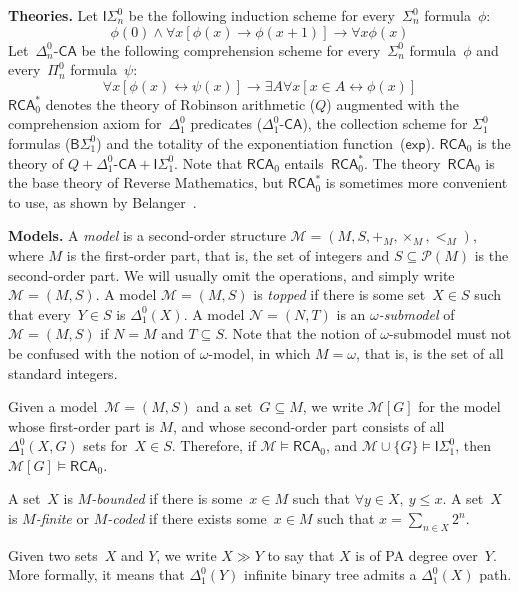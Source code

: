 \documentclass{article}
\numberwithin{theorem}{section}
\newcommand{\RCA}{\mathsf{RCA}}
\newcommand{\BSig}{\mathsf{B}\Sigma^0}
\newcommand{\ISig}{\mathsf{I}\Sigma^0}
\renewcommand{\P}{\mathcal{P}}
\newcommand{\M}{\mathcal{M}}
\newcommand{\Nc}{\mathcal{N}}
\renewcommand{\P}{\mathcal{P}}
\begin{document}
\textbf{Theories.}
Let $\ISig_n$ be the following induction scheme for every~$\Sigma^0_n$ formula~$\phi$:
$$
\phi(0) \wedge \forall x[\phi(x) \rightarrow \phi(x+1)] \rightarrow \forall x \phi(x)
$$
Let~$\Delta^0_n$-$\mathsf{CA}$ be the following comprehension scheme for every~$\Sigma^0_n$ formula~$\phi$ and every~$\Pi^0_n$ formula~$\psi$:
$$
\forall x[\phi(x) \leftrightarrow \psi(x)] \rightarrow \exists A \forall x[x \in A \leftrightarrow \phi(x)]
$$
$\RCA_0^*$ denotes the theory of Robinson arithmetic ($Q$) augmented with the comprehension axiom for~$\Delta^0_1$ predicates ($\Delta^0_1$-$\mathsf{CA}$), the collection scheme for $\Sigma^0_1$ formulas ($\BSig_1$) and the totality of the exponentiation function~($\mathsf{exp}$).
$\RCA_0$ is the theory of $Q + \Delta^0_1\mbox{-}\mathsf{CA} + \ISig_1$. Note that $\RCA_0$ entails~$\RCA_0^*$. The theory~$\RCA_0$ is the base theory of Reverse Mathematics, but $\RCA_0^*$ is sometimes more convenient to use, as shown by Belanger~\cite{Blanger2022ConservationTF}.
\bigskip

\textbf{Models.}
A \emph{model} is a second-order structure $\M = (M, S, +_M, \times_M, <_M)$, where $M$ is the first-order part, that is, the set of integers and $S \subseteq \P(M)$ is the second-order part. We will usually omit the operations, and simply write $\M = (M, S)$.
A model $\M = (M, S)$ is \emph{topped} if there is some set~$X \in S$ such that every~$Y \in S$ is $\Delta^0_1(X)$. A model $\Nc = (N, T)$ is an \emph{$\omega$-submodel} of $\M = (M, S)$ if $N = M$ and $T \subseteq S$. Note that the notion of $\omega$-submodel must not be confused with the notion of $\omega$-model, in which $M = \omega$, that is, is the set of all standard integers.

Given a model~$\M = (M, S)$ and a set~$G \subseteq M$, we write $\M[G]$ for the model whose first-order part is $M$, and whose second-order part consists of all $\Delta^0_1(X, G)$ sets for~$X \in S$. Therefore, if $\M \models \RCA_0$, and $\M \cup \{G\} \models \ISig_1$, then $\M[G] \models \RCA_0$.

A set~$X$ is \emph{$M$-bounded} if there is some~$x \in M$ such that $\forall y \in X,\ y \leq x$.
A set~$X$ is \emph{$M$-finite} or \emph{$M$-coded} if there exists some~$x \in M$ such that $x = \sum_{n \in X} 2^n$.

Given two sets~$X$ and $Y$, we write $X \gg Y$ to say that $X$ is of PA degree over~$Y$. More formally, it means that $\Delta^0_1(Y)$ infinite binary tree admits a $\Delta^0_1(X)$ path.
\bigskip
\end{document}
